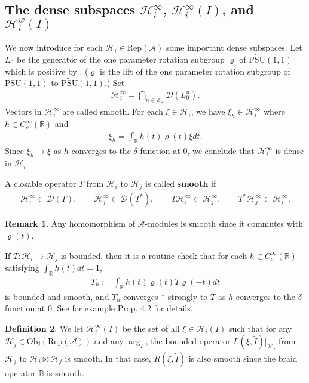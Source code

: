 \documentclass[11pt,b5paper,notitlepage]{article}
\theoremstyle{definition}
\newtheorem{df}{Definition}[subsection]
\newtheorem{rem}[df]{Remark}
\theoremstyle{plain}
\newcommand{\mc}{\mathcal}
\newcommand{\wtd}{\widetilde}
\newcommand{\Dom}{\scr D}
\newcommand{\PSU}{\mathrm{PSU}(1,1)}
\newcommand{\UPSU}{\widetilde{\mathrm{PSU}}(1,1)}
\newcommand{\scr}{\mathscr}
\newcommand{\RepA}{\mathrm{Rep}(\mc A)}
\newcommand{\mbb}{\mathbb}
\newcommand{\Obj}{\mathrm{Obj}}
\numberwithin{equation}{subsection}
\begin{document}
\subsection{The dense subspaces $\mc H_i^\infty$, $\mc H_i^\infty(I)$, and $\mc H_i^w(I)$}









We now introduce for each $\mc H_i\in\RepA$ some important dense subspaces. Let $L_0$ be the generator of the one parameter rotation subgroup $\varrho$ of $\UPSU$ which is positive by \cite[Thm. 3.8]{Wei06}. ($\varrho$ is the lift of the one parameter rotation subgroup of $\PSU$ to $\UPSU$.) Set \index{Hi@$\mc H_i^\infty$}
\begin{align}
\mc H_i^\infty=\bigcap_{n\in\mbb Z_+}\Dom(L_0^n).
\end{align}
Vectors in $\mc H_i^\infty$ are called smooth. For each $\xi\in\mc H_i$,  we have $\xi_h\in\mc H_i^\infty$ where $h\in C_c^\infty(\mbb R)$ and
\begin{align}
\xi_h=\int_{\mbb R}h(t)\varrho(t)\xi dt.
\end{align}
Since $\xi_h\rightarrow\xi$ as $h$ converges to the $\delta$-function at $0$, we conclude that $\mc H_i^\infty$ is dense in $\mc H_i$. 

A closable operator $T$ from $\mc H_i$ to $\mc H_j$ is called \textbf{smooth} if
\begin{gather}
\mc H_i^\infty\subset\Dom(T),\qquad \mc H_j^\infty\subset\Dom(T^*),\qquad  T\mc H_i^\infty\subset \mc H_j^\infty,\qquad T^*\mc H_j^\infty\subset \mc H_i^\infty.
\end{gather}

\begin{rem}\label{lb102}
Any homomorphism of $\mc A$-modules is smooth since it commutes  with $\varrho(t)$. 
\end{rem}
If $T:\mc H_i\rightarrow\mc H_j$ is  bounded, then it is a routine check that for each $h\in C_c^\infty(\mbb R)$ satisfying $\int_{\mbb R}h(t)dt=1$,
\begin{align}
T_h:=\int_{\mbb R}h(t)\varrho(t)T\varrho(-t)dt
\end{align}
is bounded and smooth, and $T_h$  converges $*$-strongly to $T$  as $h$ converges to the $\delta$-function at $0$. See for example \cite{Gui19b} Prop. 4.2 for details.

\begin{df}
We let $\mc H_i^\infty(I)$  be the set of all $\xi\in\mc H_i(I)$ such that for any $\mc H_j\in\Obj(\RepA)$ and any $\arg_I$, the bounded operator $L (\xi,\wtd I)|_{\mc H_j}$ from $\mc H_j$ to $\mc H_i\boxtimes\mc H_j$ is smooth. In that case, $R(\xi,\wtd I)$ is also smooth since the braid operator $\mbb B$ is smooth.
\end{df}
\end{document}
